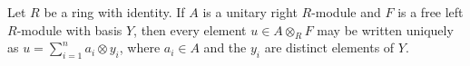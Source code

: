 Let $R$ be a ring with identity. If $A$ is a unitary right $R$-module and $F$ is a free left $R$-module with basis $Y$, then every element $u \in A \otimes_R F$ may be written uniquely as $u = \sum_{i=1}^{n} a_i \otimes y_i$, where $a_i \in A$ and the $y_i$ are distinct elements of $Y$.

